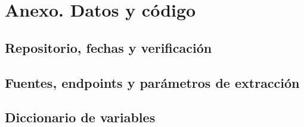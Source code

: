 \section{Anexo. Datos y código}

\subsection{Repositorio, fechas y verificación}
\begin{singlespace}

\end{singlespace}

\subsection{Fuentes, endpoints y parámetros de extracción}
\begin{singlespace}

\end{singlespace}

\subsection{Diccionario de variables}
\begin{singlespace}

\end{singlespace}
